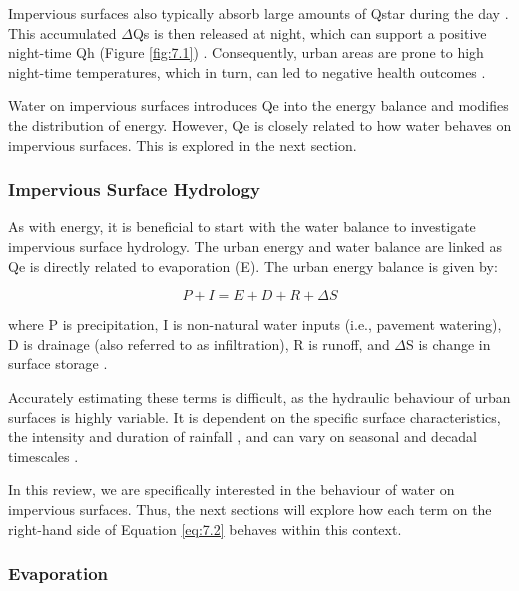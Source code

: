 \documentclass[final,3p,times,authoryear]{elsarticle}
\begin{document}
Impervious surfaces also typically absorb large amounts of \gls{Qstar} during the day \citep{Cohard2018}. This accumulated $\Delta$\gls{Qs} is then released at night, which can support a positive night-time \gls{Qh} (Figure \ref{fig:7.1}) \citep{Oke2017,Cohard2018}. Consequently, urban areas are prone to high night-time temperatures, which in turn, can led to negative health outcomes \citep{Clarke1972,Coutts2010}. 

Water on impervious surfaces introduces \gls{Qe} into the energy balance and modifies the distribution of energy. However, \gls{Qe} is closely related to how water behaves on impervious surfaces. This is explored in the next section.

\subsubsection{Impervious Surface Hydrology}\label{sec:appendix7.1.3}
As with energy, it is beneficial to start with the water balance to investigate impervious
surface hydrology. The urban energy and water balance are linked as \gls{Qe} is directly
related to evaporation (\gls{E}). The urban energy balance is given by:

\begin{equation}
P + I = E + D + R + \Delta S
\label{eq:7.2} 
\end{equation}

where \gls{P} is precipitation, \gls{I} is non-natural water inputs (i.e., pavement watering), \gls{D} is drainage (also referred to as infiltration), \gls{R} is runoff, and $\Delta$S is change in surface storage \citep{Grimmond1986,Mitchell2008}.

Accurately estimating these terms is difficult, as the hydraulic behaviour of urban
surfaces is highly variable. It is dependent on the specific surface characteristics, the intensity and duration of rainfall \citep{Fletcher2013}, and can vary on seasonal and
decadal timescales \citep{Redfern2016}.

In this review, we are specifically interested in the behaviour of water on impervious
surfaces. Thus, the next sections will explore how each term on the right-hand side of
Equation \ref{eq:7.2} behaves within this context.

\subsubsection{Evaporation}\label{sec:appendix7.1.3.1}
\end{document}
